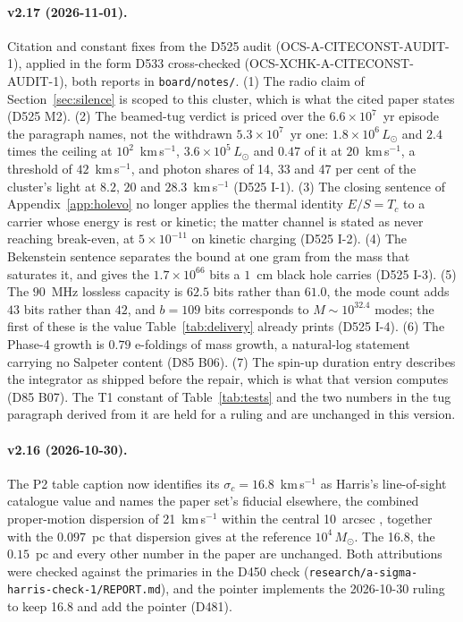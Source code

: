 \documentclass[11pt]{article}
\newcommand{\msun}{\ensuremath{M_\odot}}
\begin{document}
\paragraph{v2.17 (2026-11-01).} Citation and constant fixes from the D525 audit (OCS-A-CITECONST-AUDIT-1), applied in the form D533 cross-checked (OCS-XCHK-A-CITECONST-AUDIT-1), both reports in \texttt{board/notes/}. (1) The radio claim of Section~\ref{sec:silence} is scoped to this cluster, which is what the cited paper states (D525 M2). (2) The beamed-tug verdict is priced over the $6.6\times10^{7}$~yr episode the paragraph names, not the withdrawn $5.3\times10^{7}$~yr one: $1.8\times10^{6}\,L_\odot$ and $2.4$ times the ceiling at $10^{2}$~km\,s$^{-1}$, $3.6\times10^{5}\,L_\odot$ and $0.47$ of it at $20$~km\,s$^{-1}$, a threshold of $42$~km\,s$^{-1}$, and photon shares of 14, 33 and 47 per cent of the cluster's light at $8.2$, $20$ and $28.3$~km\,s$^{-1}$ (D525 I-1). (3) The closing sentence of Appendix~\ref{app:holevo} no longer applies the thermal identity $E/S = T_c$ to a carrier whose energy is rest or kinetic; the matter channel is stated as never reaching break-even, at $5\times10^{-11}$ on kinetic charging (D525 I-2). (4) The Bekenstein sentence separates the bound at one gram from the mass that saturates it, and gives the $1.7\times10^{66}$ bits a $1$~cm black hole carries (D525 I-3). (5) The $90$~MHz lossless capacity is $62.5$ bits rather than $61.0$, the mode count adds $43$ bits rather than $42$, and $b = 109$ bits corresponds to $M \sim 10^{32.4}$ modes; the first of these is the value Table~\ref{tab:delivery} already prints (D525 I-4). (6) The Phase-4 growth is $0.79$ e-foldings of mass growth, a natural-log statement carrying no Salpeter content (D85 B06). (7) The spin-up duration entry describes the integrator as shipped before the repair, which is what that version computes (D85 B07). The T1 constant of Table~\ref{tab:tests} and the two numbers in the tug paragraph derived from it are held for a ruling and are unchanged in this version.

\paragraph{v2.16 (2026-10-30).} The P2 table caption now identifies its $\sigma_c = 16.8$~km\,s$^{-1}$ as Harris's line-of-sight catalogue value and names the paper set's fiducial elsewhere, the combined proper-motion dispersion of 21~km\,s$^{-1}$ within the central 10~arcsec \citep{Haberle2025oMEGACatVI}, together with the $0.097$~pc that dispersion gives at the reference $10^{4}\,\msun$. The 16.8, the $0.15$~pc and every other number in the paper are unchanged. Both attributions were checked against the primaries in the D450 check (\texttt{research/a-sigma-harris-check-1/REPORT.md}), and the pointer implements the 2026-10-30 ruling to keep 16.8 and add the pointer (D481).
\end{document}
